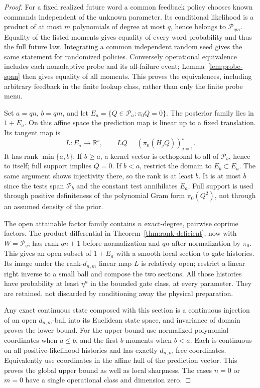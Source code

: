 \begin{proof}
For a fixed realized future word a common feedback policy chooses known
commands independent of the unknown parameter. Its conditional likelihood
is a product of at most $m$ polynomials of degree at most $q$, hence belongs
to $\mathcal P_{qm}$. Equality of the listed moments gives equality of every
word probability and thus the full future law. Integrating a common
independent random seed gives the same statement for randomized policies.
Conversely operational equivalence includes each nonadaptive probe and its
all-failure event; Lemma~\ref{lem:probe-span} then gives equality of all
moments. This proves the equivalences, including arbitrary feedback in the
finite lookup class, rather than only the finite probe menu.

Set $a=qn$, $b=qm$, and let
$E_a=\{Q\in\mathcal P_a:\pi_0Q=0\}$. The posterior family lies in
$1+E_a$. On this affine space the prediction map is linear up to a fixed
translation. Its tangent map is
\[
 L:E_a\longrightarrow\mathbb R^s,\qquad
 LQ=(\pi_0(H_jQ))_{j=1}^s.
\]
It has rank $\min\{a,b\}$. If $b\ge a$, a kernel vector is orthogonal to
all of $\mathcal P_b$, hence to itself; full support implies $Q=0$.
If $b<a$, restrict the domain to $E_b\subset E_a$. The same argument
shows injectivity there, so the rank is at least $b$. It is at most $b$
since the tests span $\mathcal P_b$ and the constant test annihilates
$E_a$. Full support is used through positive definiteness of the polynomial
Gram form $\pi_0(Q^2)$, not through an assumed density of the prior.

The open attainable factor family contains $n$ exact-degree, pairwise
coprime factors. The product differential in
Theorem~\ref{thm:rank-deficient}, now with $W=\mathcal P_q$, has rank
$qn+1$ before normalization and $qn$ after normalization by $\pi_0$.
This gives an open subset of $1+E_a$ with a smooth local section to gate
histories. Its image under the rank-$d_{n,m}$ linear map $L$ is relatively
open; restrict a linear right inverse to a small ball and compose the two
sections. All those histories have probability at least $\eta^n$ in the
bounded gate class, at every parameter. They are retained, not discarded
by conditioning away the physical preparation.

Any exact continuous state composed with this section is a continuous
injection of an open $d_{n,m}$-ball into its Euclidean state space, and
invariance of domain proves the lower bound. For the upper bound use
normalized polynomial coordinates when $a\le b$, and the first $b$ moments
when $b<a$. Each is continuous on all positive-likelihood histories and
has exactly $d_{n,m}$ free coordinates. Equivalently use coordinates in
the affine hull of the prediction vector. This proves the global upper
bound as well as local sharpness. The cases $n=0$ or $m=0$ have a single
operational class and dimension zero.
\end{proof}

